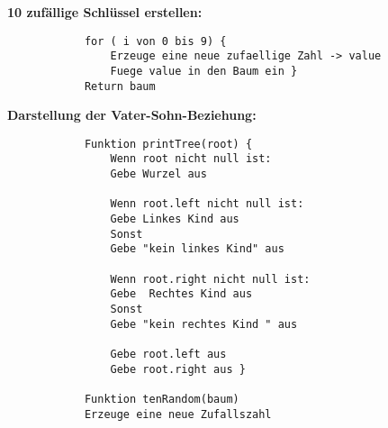 \documentclass[12pt]{article}
\begin{document}
		\newline
		\textbf{10 zufällige Schlüssel erstellen:}
		\begin{lstlisting} 
			for ( i von 0 bis 9) {
				Erzeuge eine neue zufaellige Zahl -> value
				Fuege value in den Baum ein }
			Return baum
		\end{lstlisting} 
		\newpage %
		\textbf{Darstellung der Vater-Sohn-Beziehung:}
		\begin{lstlisting}
			Funktion printTree(root) {
				Wenn root nicht null ist:
				Gebe Wurzel aus
				
				Wenn root.left nicht null ist:
				Gebe Linkes Kind aus
				Sonst
				Gebe "kein linkes Kind" aus
				
				Wenn root.right nicht null ist:
				Gebe  Rechtes Kind aus
				Sonst
				Gebe "kein rechtes Kind " aus
				
				Gebe root.left aus
				Gebe root.right aus }
			
			Funktion tenRandom(baum)
			Erzeuge eine neue Zufallszahl
			
		\end{lstlisting}
		
\end{document}
